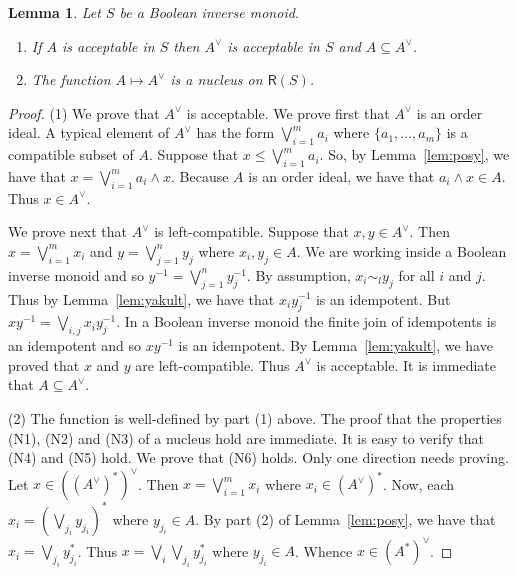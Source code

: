 \documentclass[a4paper]{amsart}
\newtheorem{lemma}[theorem]{Lemma}
\begin{document}
\begin{lemma}\label{lem:coffee} 
Let $S$ be a Boolean inverse monoid.
\begin{enumerate}

\item  If $A$ is acceptable in $S$ then $A^{\vee}$ is acceptable in $S$ and $A \subseteq A^{\vee}$.

\item The function $A \mapsto A^{\vee}$ is a nucleus on  $\mathsf{R}(S)$.

\end{enumerate}
\end{lemma}
\begin{proof} (1) We prove that $A^{\vee}$ is acceptable.
We prove first that  $A^{\vee}$ is an order ideal.
A typical element of  $A^{\vee}$
has the form $\bigvee_{i = 1}^{m} a_{i}$ 
where $\{a_{1}, \ldots, a_{m}\}$ is a compatible subset of $A$.
Suppose that $x \leq \bigvee_{i = 1}^{m} a_{i}$.
So, by Lemma~\ref{lem:posy}, we have that  
$x = \bigvee_{i = 1}^{m} a_{i} \wedge x$.
Because $A$ is an order ideal, we have that $a_{i} \wedge x \in A$.
Thus $x \in A^{\vee}$.

We prove next that  $A^{\vee}$ is left-compatible.
Suppose that $x,y \in A^{\vee}$.
Then $x = \bigvee_{i=1}^{m}x_{i}$ and $y = \bigvee_{j=1}^{n} y_{j}$ 
where $x_{i}, y_{j} \in A$.
We are working inside a Boolean inverse monoid and so
$y^{-1} = \bigvee_{j=1}^{n} y_{j}^{-1}$. 
By assumption, $x_{i} \sim_{l} y_{j}$ for all $i$ and $j$.
Thus by Lemma~\ref{lem:yakult},
we have that $x_{i}y_{j}^{-1}$ is an idempotent.
But $xy^{-1} = \bigvee_{i,j}x_{i}y_{j}^{-1}$.
In a Boolean inverse monoid the finite join of idempotents is an idempotent and so $xy^{-1}$ is an idempotent.
By Lemma~\ref{lem:yakult},
we have proved that $x$ and $y$ are left-compatible.
Thus $A^{\vee}$ is acceptable.
It is immediate that $A \subseteq A^{\vee}$.

(2) The function is well-defined by part (1) above.
The proof that the properties (N1), (N2) and (N3) of a nucleus hold are immediate.
It is easy to verify that (N4) and (N5) hold.
We prove that (N6) holds.
Only one direction needs proving.
Let $x \in ((A^{\vee})^{\ast})^{\vee}$.
Then $x = \bigvee_{i=1}^{m} x_{i}$
where $x_{i} \in (A^{\vee})^{\ast}$.
Now, each $x_{i} = (\bigvee_{j_{i}} y_{j_{i}})^{\ast}$ where $y_{j_{i}} \in A$.
By part (2) of Lemma~\ref{lem:posy},
we have that 
$x_{i} = \bigvee_{j_{i}} y_{j_{i}}^{\ast}$.
Thus $x = \bigvee_{i}\bigvee_{j_{i}} y_{j_{i}}^{\ast}$ where $y_{j_{i}} \in A$.
Whence $x \in (A^{\ast})^{\vee}$.
\end{proof}
\end{document}
